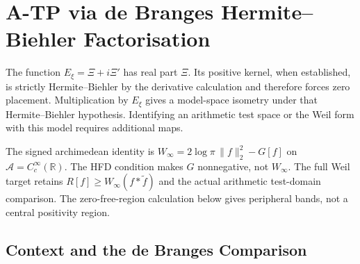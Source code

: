 \chapter{A-TP via de Branges Hermite--Biehler Factorisation}
\label{v4-arith:w7-c:chapter}

The function \(E_\xi=\Xi+i\Xi'\) has real part \(\Xi\).
Its positive kernel, when established, is strictly Hermite--Biehler
by the derivative calculation and therefore forces zero placement.
Multiplication by \(E_\xi\) gives a model-space isometry under
that Hermite--Biehler hypothesis. Identifying an arithmetic test
space or the Weil form with this model requires additional maps.

The signed archimedean identity is
\(W_\infty=2\log\pi\,\|f\|_2^2-G[f]\) on
\(\mathscr A=C_c^\infty(\mathbb R)\). The HFD condition makes
\(G\) nonnegative, not \(W_\infty\). The full Weil target retains
\(R[f]\geq W_\infty(f*\widetilde f)\) and the actual arithmetic
test-domain comparison. The zero-free-region calculation below
gives peripheral bands, not a central positivity region.

\section{Context and the de Branges Comparison}
\label{v4-arith:w7-c:context}

